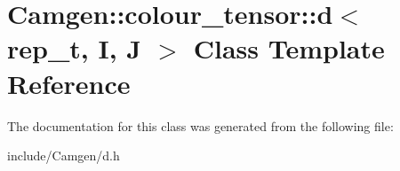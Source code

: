 \hypertarget{a00114}{\section{Camgen\-:\-:colour\-\_\-tensor\-:\-:d$<$ rep\-\_\-t, I, J $>$ Class Template Reference}
\label{a00114}
}


The documentation for this class was generated from the following file\-:\begin{DoxyCompactItemize}
\item 
include/\-Camgen/d.\-h\end{DoxyCompactItemize}
